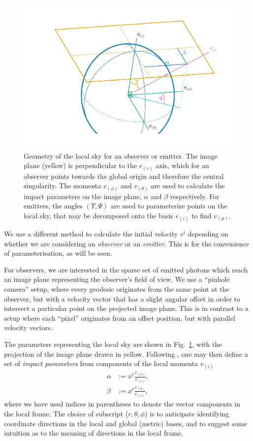 \documentclass[fleqn,usenatbib]{mnras}
\begin{document}
\begin{figure}
    \centering
    \includegraphics[width=0.99\linewidth]{figures/skycoords.pdf}
    \caption{
    Geometry of the local sky for an observer or emitter. The image plane (yellow) is
    perpendicular to the $e_{(r)}$ axis, which for an observer points towards
    the global origin and therefore the central singularity. The momenta
    $v_{(\phi)}$ and $v_{(\theta)}$ are used to calculate the impact parameters
    on the image plane, $\alpha$ and $\beta$ respectively. For emitters, the
    angles $(\Upsilon, \Psi)$ are used to parameterize points on the local sky,
    that may be decomposed onto the basis $e_{(i)}$ to find $v_{(\mu)}$.
    }
    \label{fig:observer-coordinates}
\end{figure}

We use a different method to calculate the initial velocity $v^i$ depending on
whether we are considering an \emph{observer} or an \emph{emitter}. This is for
the convenience of parameterisation, as will be seen.

For observers, we are interested in the sparse set of emitted photons which
reach an image plane representing the observer's field of view. We use a
``pinhole camera'' setup, where every geodesic originates from the same point at
the observer, but with a velocity vector that has a slight angular offset in
order to intersect a particular point on the projected image plane. This is in
contrast to a setup where each ``pixel'' originates from an offset position, but
with parallel velocity vectors.

The parameters representing the local sky are shown in
Fig.~\ref{fig:observer-coordinates}, with the projection of the image plane
drawn in yellow. Following \citet{cunningham_optical_1973}, one may then define
a set of \emph{impact parameters} from components of the local momenta $v_{(i)}$
\begin{align}
    \alpha &:=  x^r \frac{v_{(\phi)}}{v_{(r)}}, \\
    \beta &:= x^r \frac{v_{(\theta)}}{v_{(r)}},
\end{align}
where we have used indices in parentheses to denote the vector components in the
local frame. The choice of subscript ($r, \theta, \phi$) is to anticipate
identifying coordinate directions in the local and global (metric) bases, and to
suggest some intuition as to the meaning of directions in the local frame.
\end{document}

